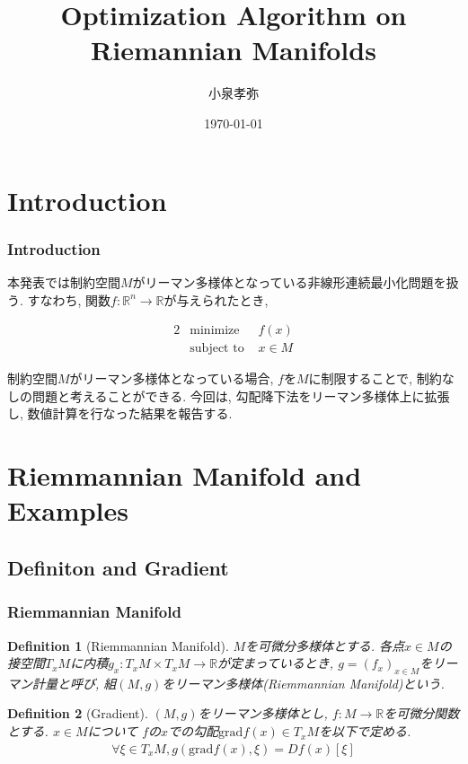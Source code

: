 \documentclass[dvipdfmx,11pt]{beamer}		%
\title{Optimization Algorithm on Riemannian Manifolds}
\author{小泉孝弥}
\institute{立命館大学大学院 修士2年}
\date{\today}
\makeatletter
\newtheorem{defi}{Definition}
\newcommand{\R}{\mathbb{R}}
\newcommand{\tpm}{T_xM}
\newcounter{mpproblem}[section]
\newenvironment{mpproblem}[1]%
{%
    \protected@edef\@currentlabelname{#1}%
    \par\vspace{\baselineskip}\noindent%
    \ifx#1\empty %
    \else \refstepcounter{mpproblem}$($#1$)$ %
    \fi%
    \hfill%
    $\left|%
    \hfill%
    \hspace{0.00\textwidth}%
    \@fleqntrue\@mathmargin\parindent%
    \begin{minipage}{0.86\textwidth}%
    \vspace{-1.0\baselineskip}%
}%
{%
    \end{minipage}%
    \@fleqnfalse%
    \right.$%
    \par\vspace{\baselineskip}\noindent%
    \ignorespacesafterend%
}%
\newenvironment{mpproblem*}%
{%
    \begin{mpproblem}{}%
}%
{%
    \end{mpproblem}%
    \ignorespacesafterend%
}
\makeatother
\begin{document}
    \begin{frame}\frametitle{}
        \titlepage
    \end{frame}

    \section{Introduction}
    \begin{frame}
        \frametitle{Introduction}
        本発表では制約空間$M$がリーマン多様体となっている非線形連続最小化問題を扱う. すなわち, 
        関数$f : \R^n\to\R$が与えられたとき, 
        \begin{mpproblem*}
            \begin{alignat*}{2}
                &\text{minimize}   & f(x)  \\
                &\text{subject to } & x\in M  
            \end{alignat*}
        \end{mpproblem*}
        制約空間$M$がリーマン多様体となっている場合, $f$を$M$に制限することで, 制約なしの問題と考えることができる. 
        今回は, 勾配降下法をリーマン多様体上に拡張し, 数値計算を行なった結果を報告する.
    \end{frame}

    \section{Riemmannian Manifold and Examples}
    \subsection{Definiton and Gradient}
    \begin{frame}\frametitle{Riemmannian Manifold}
        \begin{defi}[Riemmannian Manifold]
            $M$を可微分多様体とする. 各点$x\in M$の接空間$\tpm$に内積$g_x : \tpm\times\tpm\to\R$が定まっているとき, 
            $g = (f_x)_{x\in M}$をリーマン計量と呼び, 組$(M, g)$をリーマン多様体(Riemmannian Manifold)という.
        \end{defi}
        \begin{defi}[Gradient]
            $(M, g)$をリーマン多様体とし, $f:M\to\R$を可微分関数とする. $x\in M$について
            $f$の$x$での勾配$\mathrm{grad}f(x)\in\tpm$を以下で定める.
            \begin{align*}
                \forall\xi\in\tpm, g(\mathrm{grad}f(x), \xi) = Df(x)[\xi]
            \end{align*}
        \end{defi}
    \end{frame}
\end{document}
